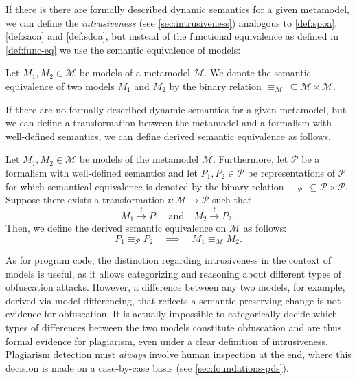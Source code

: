 If there is there are formally described dynamic semantics for a given metamodel, we can define the \textit{intrusiveness} (see \autoref{sec:intrusiveness}) analogous to \autoref{def:spoa}, \autoref{def:saoa} and \autoref{def:sdoa}, but instead of the functional equivalence as defined in \autoref{def:func-eq} we use the semantic equivalence of models:
\begin{theorem}\label{def:sem-eq}
Let \(M_1, M_2 \in \mathcal{M}\) be models of a metamodel \(\mathcal{M}\). 
We denote the semantic equivalence of two models \(M_1\) and \(M_2\) by the binary relation \(\equiv_{\mathcal{M}} \, \subseteq \mathcal{M} \times \mathcal{M}\).
\end{theorem}

If there are no formally described dynamic semantics for a given metamodel, but we can define a transformation between the metamodel and a formalism with well-defined semantics, we can define derived semantic equivalence as follows.
\begin{theorem}\label{def:sem-eq-derived}
Let \(M_1, M_2 \in \mathcal{M}\) be models of the metamodel \(\mathcal{M}\). Furthermore, let \(\mathcal{P}\) be a formalism with well-defined semantics and let \(P_1, P_2 \in \mathcal{P}\) be representations of \(\mathcal{P}\) for which semantical equivalence is denoted by the binary relation \(\equiv_\mathcal{P} \, \subseteq \mathcal{P} \times \mathcal{P}\).
Suppose there exists a transformation \(t: \mathcal{M} \rightarrow \mathcal{P}\) such that
\[
M_1 \xrightarrow{t} P_1 \quad \text{and} \quad M_2 \xrightarrow{t} P_2 \,.
\]
Then, we define the derived semantic equivalence on \(\mathcal{M}\) as follows:
\[
P_1 \equiv_{\mathcal{P}} P_2 \quad \implies \quad M_1 \equiv_{\mathcal{M}} M_2.
\]
\end{theorem}

As for program code, the distinction regarding intrusiveness in the context of models is useful, as it allows categorizing and reasoning about different types of obfuscation attacks. However, a difference between any two models, for example, derived via model differencing, that reflects a semantic-preserving change is not evidence for obfuscation. It is actually impossible to categorically decide which types of differences between the two models constitute obfuscation and are thus formal evidence for plagiarism, even under a clear definition of intrusiveness. Plagiarism detection must \textit{always} involve human inspection at the end, where this decision is made on a case-by-case basis (see \autoref{sec:foundations-pds}).

